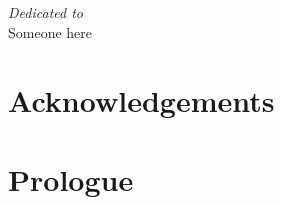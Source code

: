 \newpage
\thispagestyle{empty}
\begin{center}
 \vspace*{2cm}
  \textit{\LARGE {Dedicated to}}\\ 
 Someone here
\end{center}

\newpage
\thispagestyle{empty}
\section*{Acknowledgements}

\newpage
\section*{Prologue}

\newpage
\tableofcontents
\let\clearpage\relax
\newpage
\setcounter{page}{8}
\listoffigures
\newpage
